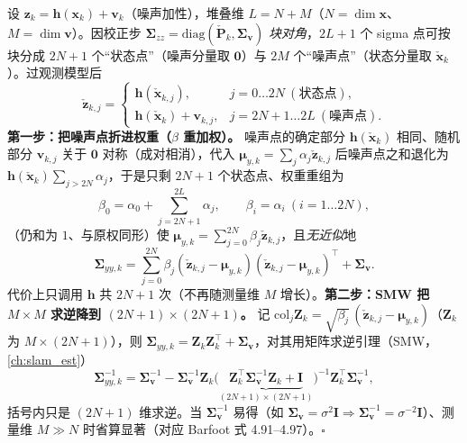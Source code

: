 \begin{derivation}\label{der:spkf-additive}
设 $\mathbf{z}_k=\mathbf{h}(\mathbf{x}_k)+\mathbf{v}_k$（噪声加性），堆叠维 $L=N+M$（$N=\dim\mathbf{x}$、$M=\dim\mathbf{v}$）。因校正步 $\boldsymbol{\Sigma}_{zz}=\mathrm{diag}(\check{\mathbf{P}}_k,\boldsymbol{\Sigma}_{\mathbf{v}})$ \emph{块对角}，$2L+1$ 个 sigma 点可按块分成 $2N+1$ 个“状态点”（噪声分量取 $\mathbf{0}$）与 $2M$ 个“噪声点”（状态分量取 $\check{\mathbf{x}}_k$）。过观测模型后
\[
  \check{\mathbf{z}}_{k,j}=\begin{cases}\mathbf{h}(\check{\mathbf{x}}_{k,j}),& j=0\dots2N\ (\text{状态点}),\\[2pt] \mathbf{h}(\check{\mathbf{x}}_k)+\mathbf{v}_{k,j},& j=2N+1\dots2L\ (\text{噪声点}).\end{cases}
\]
\textbf{第一步：把噪声点折进权重（$\beta$ 重加权）。} 噪声点的确定部分 $\mathbf{h}(\check{\mathbf{x}}_k)$ 相同、随机部分 $\mathbf{v}_{k,j}$ 关于 $\mathbf{0}$ 对称（成对相消），代入 $\boldsymbol{\mu}_{y,k}=\sum_j\alpha_j\check{\mathbf{z}}_{k,j}$ 后噪声点之和退化为 $\mathbf{h}(\check{\mathbf{x}}_k)\sum_{j>2N}\alpha_j$，于是只剩 $2N+1$ 个状态点、权重重组为
\[
  \beta_0=\alpha_0+\!\!\sum_{j=2N+1}^{2L}\!\!\alpha_j,\qquad \beta_i=\alpha_i\ (i=1\dots2N),
\]
（仍和为 $1$、与原权同形）使 $\boldsymbol{\mu}_{y,k}=\sum_{j=0}^{2N}\beta_j\check{\mathbf{z}}_{k,j}$，且\emph{无近似}地
\[
  \boldsymbol{\Sigma}_{yy,k}=\sum_{j=0}^{2N}\beta_j(\check{\mathbf{z}}_{k,j}-\boldsymbol{\mu}_{y,k})(\check{\mathbf{z}}_{k,j}-\boldsymbol{\mu}_{y,k})^\top+\boldsymbol{\Sigma}_{\mathbf{v}}.
\]
代价上只调用 $\mathbf{h}$ 共 $2N+1$ 次（不再随测量维 $M$ 增长）。\textbf{第二步：SMW 把 $M\times M$ 求逆降到 $(2N+1)\times(2N+1)$。} 记 $\mathrm{col}_j\mathbf{Z}_k=\sqrt{\beta_j}\,(\check{\mathbf{z}}_{k,j}-\boldsymbol{\mu}_{y,k})$（$\mathbf{Z}_k$ 为 $M\times(2N+1)$），则 $\boldsymbol{\Sigma}_{yy,k}=\mathbf{Z}_k\mathbf{Z}_k^\top+\boldsymbol{\Sigma}_{\mathbf{v}}$，对其用矩阵求逆引理（SMW，\cref{ch:slam_est}）
\[
  \boldsymbol{\Sigma}_{yy,k}^{-1}=\boldsymbol{\Sigma}_{\mathbf{v}}^{-1}-\boldsymbol{\Sigma}_{\mathbf{v}}^{-1}\mathbf{Z}_k\big(\underbrace{\mathbf{Z}_k^\top\boldsymbol{\Sigma}_{\mathbf{v}}^{-1}\mathbf{Z}_k+\mathbf{I}}_{(2N+1)\times(2N+1)}\big)^{-1}\mathbf{Z}_k^\top\boldsymbol{\Sigma}_{\mathbf{v}}^{-1},
\]
括号内只是 $(2N+1)$ 维求逆。当 $\boldsymbol{\Sigma}_{\mathbf{v}}^{-1}$ 易得（如 $\boldsymbol{\Sigma}_{\mathbf{v}}=\sigma^2\mathbf{I}\Rightarrow\boldsymbol{\Sigma}_{\mathbf{v}}^{-1}=\sigma^{-2}\mathbf{I}$）、测量维 $M\gg N$ 时省算显著（对应 Barfoot 式 4.91--4.97）。\hfill$\square$
\end{derivation}


